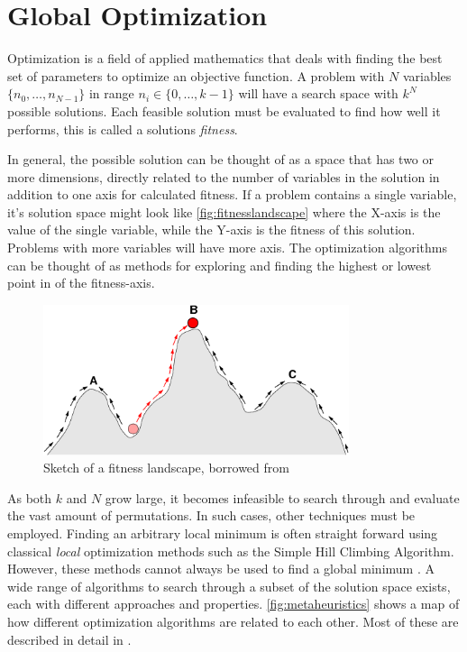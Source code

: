 \section{Global Optimization}

Optimization is a field of applied mathematics that deals with finding the best
set of parameters to optimize an objective function. A problem with $N$
variables $\{n_0, \dots, n_{N-1}\}$ in range $n_i \in \{0, \dots, k-1\}$ will
have a search space with $k^N$ possible solutions. Each feasible solution must
be evaluated to find how well it performs, this is called a solutions
\emph{fitness}.

In general, the possible solution can be thought of as a space that has two or
more dimensions, directly related to the number of variables in the solution
in addition to one axis for calculated fitness. If a problem contains a single
variable, it's solution space might look like \autoref{fig:fitnesslandscape}
where the X-axis is the value of the single variable, while the Y-axis is the
fitness of this solution. Problems with more variables will have more axis. The
optimization algorithms can be thought of as methods for exploring and finding
the highest or lowest point in of the fitness-axis.

\begin{figure}
    \centering
    \includegraphics[width=0.8\textwidth]{figs/Fitness-landscape-cartoon.png}
    \caption{Sketch of a fitness landscape, borrowed from \cite{wikifitnesslandscape}}
    \label{fig:fitnesslandscape}
\end{figure}

As both $k$ and $N$ grow large, it becomes infeasible to search through and
evaluate the vast amount of permutations. In such cases, other techniques must
be employed. Finding an arbitrary local minimum is often straight forward using
classical \emph{local} optimization methods such as the Simple Hill Climbing
Algorithm. However, these methods cannot always be used to find a global minimum
\cite{russellnorvig}. A wide range of algorithms to search through a subset of
the solution space exists, each with different approaches and properties.
\autoref{fig:metaheuristics} shows a map of how different optimization
algorithms are related to each other. Most of these are described in detail in
\cite{russellnorvig}.

